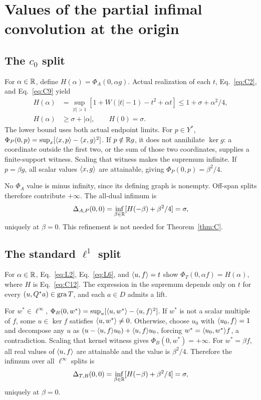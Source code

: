 \appendix
\section{Values of the partial infimal convolution at the origin}
\label{sec:split}
\subsection{The $c_0$ split}
\label{sec:C7}
For $\alpha\in\mathbb R$, define $H(\alpha)=\Phi_A(0,\alpha g)$.
Actual realization of each $t$, Eq.~\eqref{eq:C2}, and
Eq.~\eqref{eq:C9} yield
\begin{equation}
\begin{aligned}
H(\alpha)&=\sup_{|t|>1}[1+W(|t|-1)-t^2+\alpha t]
 \le1+\sigma+\alpha^2/4,\\
H(\alpha)&\ge\sigma+|\alpha|,\qquad H(0)=\sigma.
\end{aligned}
\tag{C12}\label{eq:C12}
\end{equation}
The lower bound uses both actual endpoint limits. For $p\in Y^*$,
$\Phi_P(0,p)=\sup_x[\langle x,p\rangle-\langle x,g\rangle^2]$.
If $p\notin\mathbb R g$, it does not annihilate $\ker g$: a coordinate outside
the first two, or the sum of those two coordinates, supplies a
finite-support witness. Scaling that witness makes the supremum infinite.
If $p=\beta g$, all scalar values $\langle x,g\rangle$ are attainable, giving
$\Phi_P(0,p)=\beta^2/4$.

No $\Phi_A$ value is minus infinity, since its defining graph is nonempty.
Off-span splits therefore contribute $+\infty$. The all-dual infimum is
\[
\Delta_{A,P}(0,0)=\inf_{\beta\in\mathbb R}[H(-\beta)+\beta^2/4]=\sigma,
\]
uniquely at $\beta=0$. This refinement is not needed for
Theorem~\ref{thm:C}.

\subsection{The standard $\ell^1$ split}
\label{sec:L6}
For $\alpha\in\mathbb R$, Eq.~\eqref{eq:L2}, Eq.~\eqref{eq:L6}, and
$\langle u,f\rangle=t$ show $\Phi_T(0,\alpha f)=H(\alpha)$, where $H$ is
Eq.~\eqref{eq:C12}. The expression in the supremum depends only on
$t$ for every $(u,Q^*a)\in\operatorname{gra} T$, and each $a\in D$ admits a lift.

For $w^*\in\ell^\infty$,
$\Phi_B(0,w^*)=\sup_u[\langle u,w^*\rangle-\langle u,f\rangle^2]$.
If $w^*$ is not a scalar multiple of $f$, some $u\in\ker f$ satisfies
$\langle u,w^*\rangle\ne0$. Otherwise, choose $u_0$ with $\langle u_0,f\rangle=1$ and
decompose any $u$ as $(u-\langle u,f\rangle u_0)+\langle u,f\rangle u_0$, forcing
$w^*=\langle u_0,w^*\rangle f$, a contradiction.
Scaling that kernel witness gives $\Phi_B(0,w^*)=+\infty$.
For $w^*=\beta f$, all real values of $\langle u,f\rangle$ are attainable and
the value is $\beta^2/4$. Therefore the infimum over all $\ell^\infty$
splits is
\[
\Delta_{T,B}(0,0)=\inf_{\beta\in\mathbb R}[H(-\beta)+\beta^2/4]=\sigma,
\]
uniquely at $\beta=0$.


